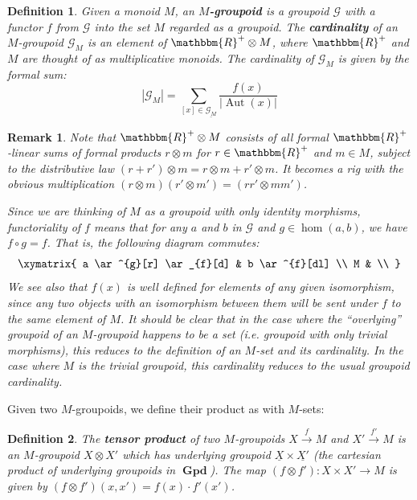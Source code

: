 \documentclass{amsart} \usepackage{amsmath,amssymb,bbm}
\newcommand{\opname}[1]{\operatorname{#1}}
\newtheorem{definition}{Definition}
\newcommand{\catname}[1]{\boldsymbol{\opname{{#1}}}}
\newcommand{\MRp}{\mathbbm{R}^+ \otimes M}
\newtheorem{varremark}{Remark}
\newenvironment{remark}{\begin{varremark}\em}{\em\end{varremark}}
\newcommand{\rightarrowlim}{\mathop{\rightarrow}\limits}
\begin{document}
\begin{definition} Given a monoid $M$, an \textbf{$M$-groupoid} is a
groupoid $\mathcal{G}$ with a functor $f$ from $\mathcal{G}$ into the
set $M$ regarded as a groupoid.  The \textbf{cardinality} of an
$M$-groupoid $\mathcal{G}_M$ is an element of $\MRp$, where
$\mathbbm{R}^+$ and $M$ are thought of as multiplicative monoids.  The
cardinality of $\mathcal{G}_M$ is given by the formal sum:
\begin{equation}
   |\mathcal{G}_M| = \sum_{[x] \in \underline{\mathcal{G}_M}} \frac{f(x)}{|\opname{Aut}(x)|}
\end{equation}
\end{definition}

\begin{remark} Note that $\MRp$ consists of all formal
$\mathbbm{R}^+$-linear sums of formal products $r \otimes m$ for $r
\in \mathbbm{R}^+$ and $m \in M$, subject to the distributive law
$(r+r')\otimes m = r \otimes m + r'\otimes m$.  It becomes a rig with
the obvious multiplication $(r\otimes m)(r' \otimes m') = (rr'
\otimes mm')$.

Since we are thinking of $M$ as a groupoid with only identity
morphisms, functoriality of $f$ means that for any $a$ and $b$ in
$\mathcal{G}$ and $g \in \opname{hom}(a,b)$, we have $f\circ g = f$.
That is, the following diagram commutes:
\begin{equation}
  \xymatrix{
    a \ar^{g}[r] \ar_{f}[d] & b \ar^{f}[dl] \\
    M & \\
  }
\end{equation} We see also that $f(x)$ is well defined for elements of
any given isomorphism, since any two objects with an isomorphism
between them will be sent under $f$ to the same element of $M$.  It
should be clear that in the case where the ``overlying'' groupoid of
an $M$-groupoid happens to be a set (i.e. groupoid with only trivial
morphisms), this reduces to the definition of an $M$-set and its
cardinality.  In the case where $M$ is the trivial groupoid, this
cardinality reduces to the usual groupoid cardinality.
\end{remark}

Given two $M$-groupoids, we define their product as with $M$-sets:

\begin{definition} The \textbf{tensor product} of two $M$-groupoids $X
\rightarrowlim^{f} M$ and $X' \rightarrowlim^{f'} M$ is an $M$-groupoid $X
\otimes X'$ which has underlying groupoid $\underline{X} \times \underline{X'}$
(the cartesian product of underlying groupoids in $\catname{Gpd}$).  The
map $(f \otimes f'): X \times X' \rightarrow M$ is given by $(f
\otimes f')(x,x') = f(x)\cdot f'(x')$.
\end{definition}
\end{document}
